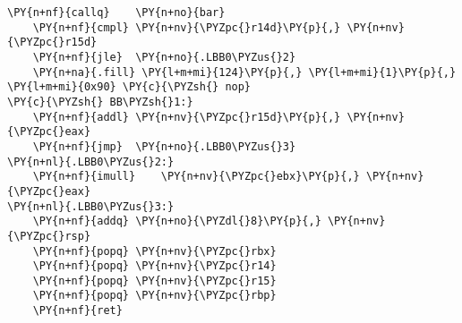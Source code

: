 \begin{Verbatim}[commandchars=\\\{\}]
	\PY{n+nf}{callq}	\PY{n+no}{bar}
	\PY{n+nf}{cmpl}	\PY{n+nv}{\PYZpc{}r14d}\PY{p}{,} \PY{n+nv}{\PYZpc{}r15d}
	\PY{n+nf}{jle}	\PY{n+no}{.LBB0\PYZus{}2}
	\PY{n+na}{.fill} \PY{l+m+mi}{124}\PY{p}{,} \PY{l+m+mi}{1}\PY{p}{,} \PY{l+m+mi}{0x90} \PY{c}{\PYZsh{} nop}
\PY{c}{\PYZsh{} BB\PYZsh{}1:}
	\PY{n+nf}{addl}	\PY{n+nv}{\PYZpc{}r15d}\PY{p}{,} \PY{n+nv}{\PYZpc{}eax}
	\PY{n+nf}{jmp}	\PY{n+no}{.LBB0\PYZus{}3}
\PY{n+nl}{.LBB0\PYZus{}2:}
	\PY{n+nf}{imull}	\PY{n+nv}{\PYZpc{}ebx}\PY{p}{,} \PY{n+nv}{\PYZpc{}eax}
\PY{n+nl}{.LBB0\PYZus{}3:}
	\PY{n+nf}{addq}	\PY{n+no}{\PYZdl{}8}\PY{p}{,} \PY{n+nv}{\PYZpc{}rsp}
	\PY{n+nf}{popq}	\PY{n+nv}{\PYZpc{}rbx}
	\PY{n+nf}{popq}	\PY{n+nv}{\PYZpc{}r14}
	\PY{n+nf}{popq}	\PY{n+nv}{\PYZpc{}r15}
	\PY{n+nf}{popq}	\PY{n+nv}{\PYZpc{}rbp}
	\PY{n+nf}{ret}
\end{Verbatim}
